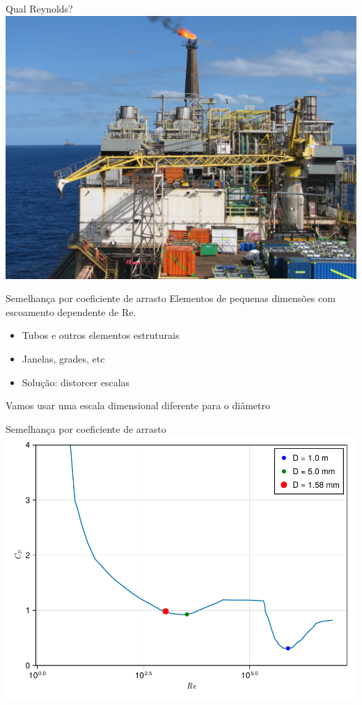 \documentclass{beamer}
\begin{document}
\begin{frame}{Qual Reynolds?}
  \centering
  \includegraphics[width=\textwidth]{./figuras/foto-p37.jpg}
\end{frame}

\begin{frame}{Semelhança por coeficiente de arrasto}
  Elementos de pequenas dimensões com escoamento dependente de Re.
  \begin{itemize}
  \item Tubos e outros elementos estruturais
  \item Janelas, grades, etc
  \item Solução: distorcer escalas
  \end{itemize}

  Vamos usar uma escala dimensional diferente para o diâmetro
\end{frame}


\begin{frame}{Semelhança por coeficiente de arrasto}
  \centering
  \includegraphics[width=\textwidth]{./figuras/cdsim.pdf}
\end{frame}
\end{document}
